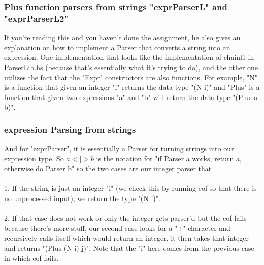 \documentclass[12pt]{article}
\begin{document}
\subsubsection{Plus function parsers from strings "exprParserL" and "exprParserL2"}

If you're reading this and you haven't done the assignment, he also gives an explanation on how to implement a Parser that converts a string into an expression. One implementation that looks like the implementation of chainl1 in ParserLib.hs (because that's essentially what it's trying to do), and the other one utilizes the fact that the "Expr" constructors are also functions. For example, "N" is a function that given an integer "i" returns the data type "(N i)" and "Plus" is a function that given two expressions "a" and "b" will return the data type "(Plus a b)".

\subsubsection{expression Parsing from strings}

And for "exprParser", it is essentially a Parser for turning strings into our expression type. So $a <|> b$ is the notation for "if Parser a works, return a, otherwise do Parser b" so the two cases are our integer parser that\\
\\
1. If the string is just an integer "i" (we check this by running eof so that there is no unprocessed input), we return the type "(N i)".\\
\\
2. If that case does not work or only the integer gets parser'd but the eof fails because there's more stuff, our second case looks for a "+" character and recursively calls itself which would return an integer, it then takes that integer and returns "(Plus (N i) j)". Note that the "i" here comes from the previous case in which eof fails.
\end{document}
